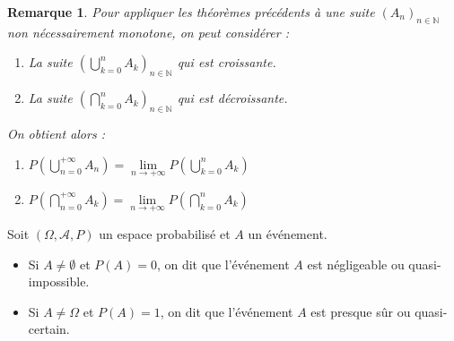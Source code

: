 \documentclass[a4paper,12pt]{book}
\newcommand{\Def}[2]{\begin{tcolorbox}[sharp corners, colback=white,colframe=blue!90!black!75, title=Définition : #1]#2\end{tcolorbox}}
\newtheorem{Rem}{Remarque}[section]
\def\N{\mathbb{N}}
\begin{document}
\begin{Rem}
Pour appliquer les théorèmes précédents à une suite $(A_n)_{n\in\N}$ non nécessairement monotone, on peut considérer :\begin{enumerate}
\item La suite $\left(\bigcup_{k=0}^nA_k\right)_{n\in\N}$ qui est croissante.
\item La suite $\left(\bigcap_{k=0}^nA_k\right)_{n\in\N}$ qui est décroissante.
\end{enumerate}
On obtient alors :\begin{enumerate}
\item $P\left(\bigcup_{n=0}^{+\infty}A_n\right)=\lim\limits_{n\to+\infty}P\left(\bigcup_{k=0}^nA_k\right)$
\item $P\left(\bigcap_{n=0}^{+\infty}A_k\right) = \lim\limits_{n\to+\infty}P\left(\bigcap_{k=0}^nA_k\right)$
\end{enumerate}
\end{Rem}
\Def{}{Soit $(\Omega,\mathcal{A}, P)$ un espace probabilisé et $A$ un événement.\begin{itemize}
\item Si $A\neq\emptyset$ et $P(A)=0$, on dit que l'événement $A$ est négligeable ou quasi-impossible.
\item Si $A\neq\Omega$ et $P(A)=1$, on dit que l'événement $A$ est presque sûr ou quasi-certain.
\end{itemize}}
\end{document}
